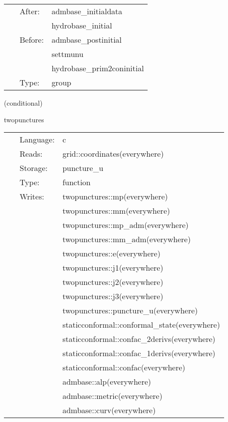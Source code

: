 \hspace{5mm}{\it twopunctures initial data group } 


\hspace{5mm}

 \begin{tabular*}{160mm}{cll} 
~ & After:  & admbase\_initialdata \\ 
~& ~ &hydrobase\_initial\\ 
~ & Before:  & admbase\_postinitial \\ 
~& ~ &settmunu\\ 
~& ~ &hydrobase\_prim2coninitial\\ 
~ & Type:  & group \\ 
\end{tabular*} 


\vspace{5mm}

   (conditional) 

\hspace{5mm} twopunctures 

\hspace{5mm}{\it create puncture black hole initial data } 


\hspace{5mm}

 \begin{tabular*}{160mm}{cll} 
~ & Language:  & c \\ 
~ & Reads:  & grid::coordinates(everywhere) \\ 
~ & Storage:  & puncture\_u \\ 
~ & Type:  & function \\ 
~ & Writes:  & twopunctures::mp(everywhere) \\ 
~& ~ &twopunctures::mm(everywhere)\\ 
~& ~ &twopunctures::mp\_adm(everywhere)\\ 
~& ~ &twopunctures::mm\_adm(everywhere)\\ 
~& ~ &twopunctures::e(everywhere)\\ 
~& ~ &twopunctures::j1(everywhere)\\ 
~& ~ &twopunctures::j2(everywhere)\\ 
~& ~ &twopunctures::j3(everywhere)\\ 
~& ~ &twopunctures::puncture\_u(everywhere)\\ 
~& ~ &staticconformal::conformal\_state(everywhere)\\ 
~& ~ &staticconformal::confac\_2derivs(everywhere)\\ 
~& ~ &staticconformal::confac\_1derivs(everywhere)\\ 
~& ~ &staticconformal::confac(everywhere)\\ 
~& ~ &admbase::alp(everywhere)\\ 
~& ~ &admbase::metric(everywhere)\\ 
~& ~ &admbase::curv(everywhere)\\ 
\end{tabular*} 


